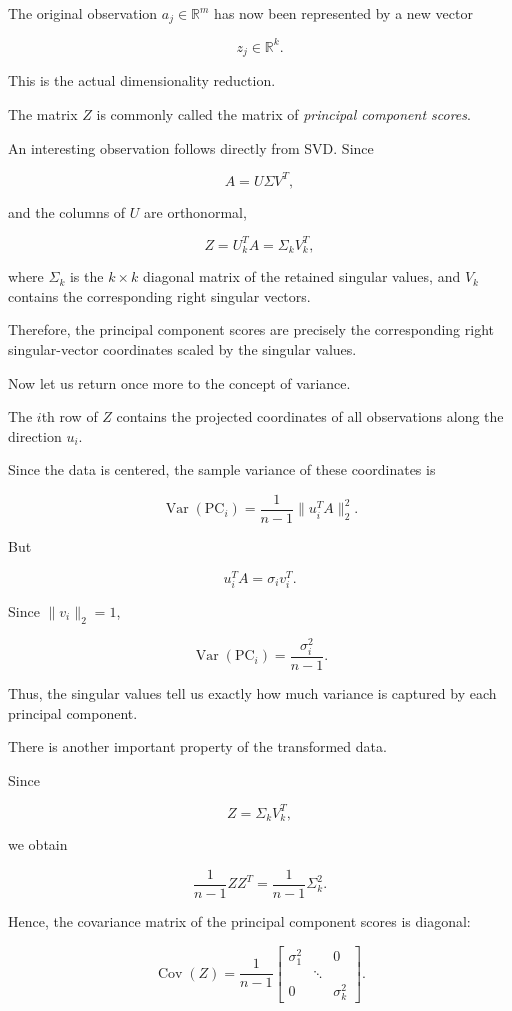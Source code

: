 \documentclass[11pt]{article}
\begin{document}
The original observation
$a_j\in\mathbb{R}^m$
has now been represented
by a new vector

\[
z_j\in\mathbb{R}^k.
\]

This is the actual
dimensionality reduction.

The matrix $Z$ is commonly
called the matrix of
\textit{principal component scores}.

An interesting observation
follows directly from SVD.
Since

\[
A=U\Sigma V^T,
\]

and the columns of $U$
are orthonormal,

\[
\boxed{
Z=U_k^TA=\Sigma_kV_k^T,
}
\]

where $\Sigma_k$ is the
$k\times k$ diagonal matrix
of the retained singular values,
and $V_k$ contains the corresponding
right singular vectors.

Therefore, the principal
component scores are precisely
the corresponding right
singular-vector coordinates
scaled by the singular values.

Now let us return once more
to the concept of variance.

The $i$th row of $Z$ contains
the projected coordinates of
all observations along
the direction $u_i$.

Since the data is centered,
the sample variance of
these coordinates is

\[
\operatorname{Var}(\mathrm{PC}_i)
=
\frac{1}{n-1}
\|u_i^TA\|_2^2.
\]

But

\[
u_i^TA=\sigma_i v_i^T.
\]

Since $\|v_i\|_2=1$,

\[
\boxed{
\operatorname{Var}(\mathrm{PC}_i)
=
\frac{\sigma_i^2}{n-1}.
}
\]

Thus, the singular values
tell us exactly how much
variance is captured
by each principal component.

There is another important
property of the transformed data.

Since

\[
Z=\Sigma_kV_k^T,
\]

we obtain

\[
\frac{1}{n-1}ZZ^T
=
\frac{1}{n-1}\Sigma_k^2.
\]

Hence, the covariance matrix
of the principal component
scores is diagonal:

\[
\boxed{
\operatorname{Cov}(Z)
=
\frac{1}{n-1}
\begin{bmatrix}
\sigma_1^2 & & 0\\
&\ddots&\\
0&&\sigma_k^2
\end{bmatrix}.
}
\]
\end{document}
